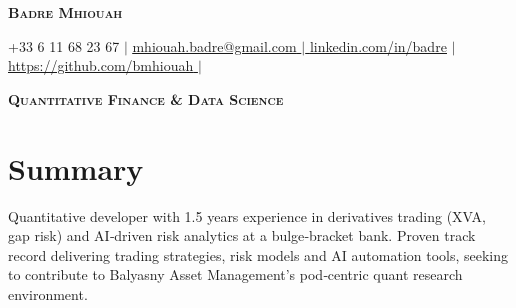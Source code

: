 \documentclass[letterpaper,10.6pt]{article}
\begin{document}


\begin{center}
    \textbf{\Huge \scshape Badre Mhiouah} 

    \small +33 6 11 68 23 67 $|$ \href{mailto:badre.mhiouah@student-cs.fr}{\underline{mhiouah.badre@gmail.com} $|$ 
    \href{https://www.linkedin.com/in/badre-mhiouah-194401227/}{\underline{linkedin.com/in/badre}}} $|$ \href{https://github.com/bmhiouah}{\underline{https://github.com/bmhiouah} $|$ }
    
\end{center}

\begin{center}
\textbf {\scshape Quantitative Finance \& Data Science} 
\end{center}

\section*{Summary}
Quantitative developer with 1.5 years experience in derivatives trading (XVA, gap risk) and AI‑driven risk analytics at a bulge‑bracket bank. Proven track record delivering trading strategies, risk models and AI automation tools, seeking to contribute to Balyasny Asset Management’s pod‑centric quant research environment.

\end{document}
